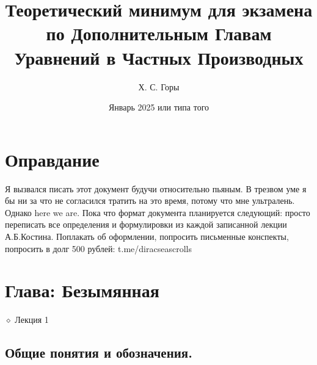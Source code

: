 \documentclass{article}
\title{Теоретический минимум для экзамена по Дополнительным Главам Уравнений в Частных Производных}
\author{Х. С. Горы}
\date{Январь 2025 или типа того}
\begin{document}
\maketitle
\centering
\newtheorem{definition}{Опр.}[section]
\newtheorem{theorem}{Теор.}[section]

\onehalfspacing

\raggedright
\setcounter{section}{-1}
\section{Оправдание}

Я вызвался писать этот документ будучи относительно пьяным. В трезвом уме я бы ни за что не согласился тратить на это время, потому что мне ультралень. Однако here we are.
Пока что формат документа планируется следующий: просто переписать все определения и формулировки из каждой записанной лекции А.Б.Костина.
\vspace{14}
Поплакать об оформлении, попросить письменные конспекты, попросить в долг 500 рублей: t.me/diracseascrolls
\vspace{14}

\section{Глава: Безымянная}

$\diamond$ Лекция 1

\subsection{Общие понятия и обозначения.}\\
\end{document}
